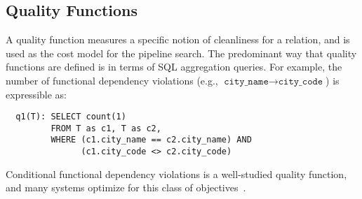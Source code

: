 



\subsection{Quality Functions}

A quality function measures a specific notion of cleanliness for a relation, and is used as the cost model for the pipeline search.  The predominant way that quality functions are defined is in terms of SQL aggregation queries. For example, the number of functional dependency violations (e.g., $\texttt{city\_name} \rightarrow \texttt{city\_code}$) is expressible as:
{\small\begin{lstlisting}
  q1(T): SELECT count(1)
         FROM T as c1, T as c2,
         WHERE (c1.city_name == c2.city_name) AND
               (c1.city_code <> c2.city_code)
\end{lstlisting}}
\noindent Conditional functional dependency violations is a well-studied quality function, and many systems optimize for this class of objectives~\cite{rekatsinas2017holoclean,DBLP:conf/sigmod/ChuIKW16}.   

